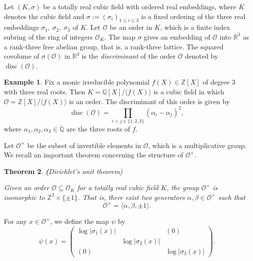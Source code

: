 \documentclass[11pt,letterpaper]{amsart}
\newtheorem{theorem}{Theorem}[section]
\theoremstyle{definition}
\newtheorem{example}[theorem]{Example}
\theoremstyle{remark}
\newcommand{\cal}[1]{\mathcal{#1}}
\newcommand{\bb}[1]{\mathbb{#1}}
\newcommand{\R}{\bb R}
\newcommand{\Z}{\bb Z}
\newcommand{\calO}{\cal O}
\DeclareMathOperator{\disc}{disc}
\newcommand{\thi}{\color{olive}}
\begin{document}
	Let $(K,\sigma)$ be a totally real cubic field with ordered real embeddings, where $K$ denotes the cubic field and  $\sigma:=(\sigma_i)_{1\leq i\leq 3}$ is a fixed ordering of the three real embeddings $\sigma_1,\ \sigma_2,\ \sigma_3$ of $K$.
	Let $\calO$ be an order in $K$, which is a finite index subring of the ring of integers $\calO_K$. 
	The map $\sigma$ gives an embedding of $\calO$ into $\R^3$ as a rank-three free abelian group, that is, a rank-three lattice. 
	The squared covolume of $\sigma(\calO)$ in $\R^3$ is the \emph{discriminant} of the order $\calO$ denoted by $\disc(\mathcal{O})$.
	
	\begin{example}
		\label{re:example_of_order}
		Fix a monic irreducible polynomial $f(X) \in \mathbb{Z}[X]$ of degree 3 with three real roots. Then $K = \mathbb{Q}[X]/\langle f(X) \rangle$ is a cubic field in which $\calO = \mathbb{Z}[X]/\langle f(X) \rangle$ is an order. The discriminant of this order is given by 
		\begin{equation}
			\disc(\calO) = \prod_{i<j\in\{1,2,3\} } (\alpha_i - \alpha_j)^{2},
		\end{equation}
		where $\alpha_1,\alpha_2,\alpha_3 \in \overline{\mathbb{Q}}$ are the three roots of $f$.
		
	\end{example}
	
	
	Let $\calO^\times$ be the subset of invertible elements in $\calO$, which is a multiplicative group. We recall an important theorem concerning the structure of $\calO^\times$.
	\begin{theorem}
		\label{th:dut}
		{\textbf (Dirichlet's unit theorem)}
		
		Given an order $\calO \subseteq \calO_K$ for a totally real cubic field $K$, the group $\calO^\times$ is isomorphic to $\Z^2\times \{\pm 1\}$.  That is, there exist two generators $\alpha,\beta \in \calO^{\times}$ such that 
		\begin{equation}
			\calO^{\times} = \langle \alpha,\beta , \pm 1 \rangle. 
		\end{equation}
	\end{theorem}
	For any $x\in\calO^\times$, we define the map $\psi$ by
	\begin{equation}
		\psi(x)=
		\begin{pmatrix}
			\log|\sigma_1(x)| &  & (0) \\
			& \log|\sigma_2(x)| & \\
			(0) & & \log|\sigma_3(x)|
		\end{pmatrix}.
		\label{eq:defi_of_psi}
	\end{equation}
	
\end{document}
